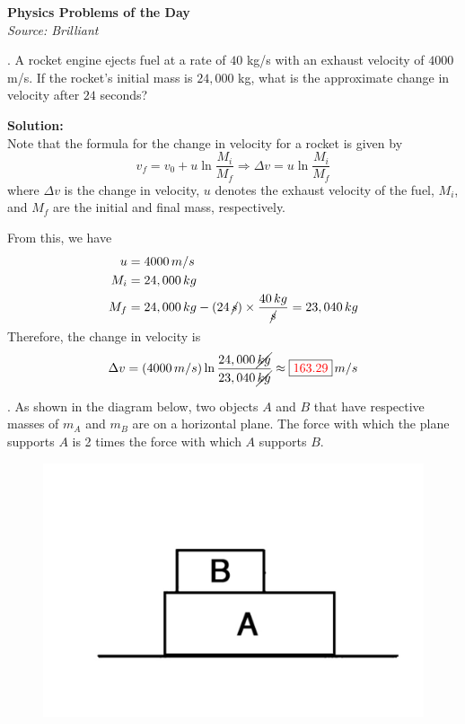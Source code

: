\documentclass[12pt]{article}
\begin{document}
	\setlength{\columnsep}{20pt}
	\renewcommand{\arraystretch}{1.5}
	\singlespacing
	
	\noindent
	\begin{center}
		{\large  \textbf{Physics Problems of the Day}} \\ 
		\emph{Source: Brilliant}
	\end{center}
	
	.	A rocket engine ejects fuel at a rate of $40$ kg/s  with an exhaust velocity of $4000$ m/s. If the rocket's initial mass is $24,000$ kg, what is the approximate change in velocity after $24$ seconds?
		
	\bigskip
	\noindent
	\textbf{Solution:} \\
		Note that the formula for the change in velocity for a rocket is given by
		\[ v_f = v_0 + u \ln \frac{M_i}{M_f} \Rightarrow \Delta v =  u \ln \frac{M_i}{M_f} \]
		where $\Delta v$ is the change in velocity, $u$ denotes the exhaust velocity of the fuel, $M_i$, and $M_f$ are the initial and final mass, respectively.
	
	\medskip
	\noindent
		From this, we have
		\begin{align*}
			u & = 4000 \, m/s \\
			M_i & = 24, 000 \, kg \\
			M_f & = 24, 000 \, kg - \left( 24 \, \cancel{s}  \right) \times \frac{40 \, kg}{\cancel{s}} = 23, 040 \, kg 
		\end{align*}
	\noindent
		Therefore, the change in velocity is
		\[ \Delta v = \left(4000 \, m/s \right) \ln \frac{24, 000 \, \cancel{kg}}{23, 040 \, \cancel{kg}} \approx \fbox{\textcolor{red}{163.29}} \, m/s \]
		
	. As shown in the diagram below, two objects $A$ and $B$ that have respective masses of $m_A$ and $m_B$ are on a horizontal plane. The force with which the plane supports $A$ is 2 times the force with which $A$ supports $B$. \\
		\begin{figure}[h]
			\centering
			\includegraphics[scale=0.1, clip=true, trim= 20mm 70mm 20mm 110mm]{physics1.jpg}
		\end{figure}
	
\end{document}
